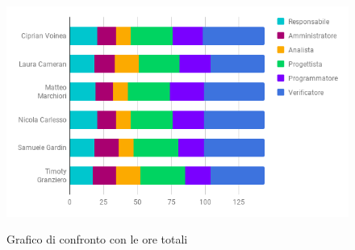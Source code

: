 			\begin{figure}[H]
					\centering
					\includegraphics[scale=0.7]{img/Ore_Totali.png}\\
					\caption{Grafico di confronto con le ore totali}
			\end{figure}